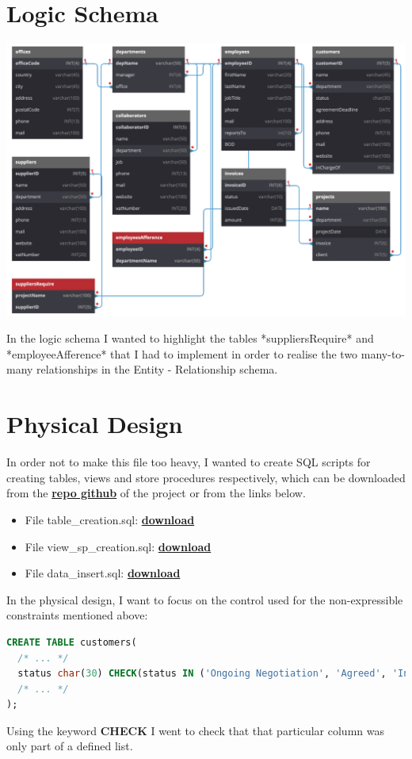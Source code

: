 \documentclass[12pt,a4paper]{article}
\begin{document}
\section{Logic Schema}\label{sec:logic-schema}
\begin{center}
\includegraphics[width=0.9\columnwidth]{../../img/logic_scheme}
\end{center}
In the logic schema I wanted to highlight the tables *suppliersRequire* and *employeeAfference* that I had to implement in order to realise the two many-to-many relationships in the Entity - Relationship schema.


\clearpage
\section{Physical Design}\label{sec:physical-design}
In order not to make this file too heavy, I wanted to create SQL scripts for creating tables, views and store procedures respectively, which can be downloaded from the \href{https://github.com/enricolacchin/database-2023-final-project/}{\textbf{repo github}} of the project or from the links below.
\begin{itemize}
\item File table\_creation.sql: \href{https://github.com/enricolacchin/database-2023-final-project/SQL/table_creation.sql}{\textbf{download}}
\item File view\_sp\_creation.sql: \href{https://github.com/enricolacchin/database-2023-final-project/SQL/view_sp_creation.sql}{\textbf{download}}
\item File data\_insert.sql: \href{https://github.com/enricolacchin/database-2023-final-project/SQL/data_insert.sql}{\textbf{download}}
\end{itemize}
In the physical design, I want to focus on the control used for the non-expressible constraints mentioned above:
\flushleft
\begin{lstlisting}[language = SQL,label={lst:check}]
CREATE TABLE customers(
  /* ... */
  status char(30) CHECK(status IN ('Ongoing Negotiation', 'Agreed', 'In Progress', 'Done')),
  /* ... */
);
\end{lstlisting}
Using the keyword \textbf{CHECK} I went to check that that particular column was only part of a defined list.
\end{document}
